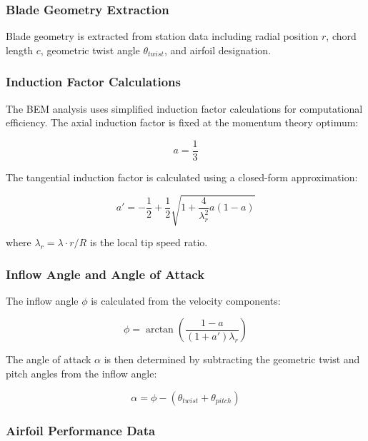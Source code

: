 \documentclass[11pt]{article}
\begin{document}
\subsubsection{Blade Geometry Extraction}

Blade geometry is extracted from station data including radial position $r$, chord length $c$, geometric twist angle $\theta_{twist}$, and airfoil designation. 

\subsubsection{Induction Factor Calculations}

The BEM analysis uses simplified induction factor calculations for computational efficiency. The axial induction factor is fixed at the momentum theory optimum:

\begin{equation}
a = \frac{1}{3}
\end{equation}

The tangential induction factor is calculated using a closed-form approximation:

\begin{equation}
a' = -\frac{1}{2} + \frac{1}{2}\sqrt{1 + \frac{4}{\lambda_r^2}a(1-a)}
\end{equation}

where $\lambda_r = \lambda \cdot r/R$ is the local tip speed ratio.

\subsubsection{Inflow Angle and Angle of Attack}

The inflow angle $\phi$ is calculated from the velocity components:

\begin{equation}
\phi = \arctan\left(\frac{1-a}{(1+a')\lambda_r}\right)
\end{equation}

The angle of attack $\alpha$ is then determined by subtracting the geometric twist and pitch angles from the inflow angle:

\begin{equation}
\alpha = \phi - (\theta_{twist} + \theta_{pitch})
\end{equation}

\subsubsection{Airfoil Performance Data}
\end{document}
